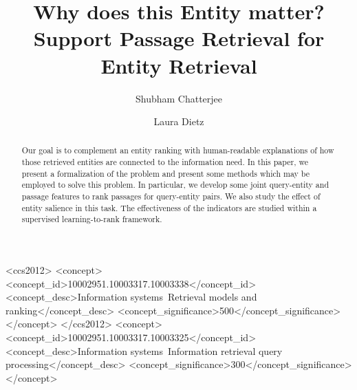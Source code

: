 \documentclass[sigconf]{acmart}
\begin{document}
\fancyhead{}


\title[Support Passage Retrieval]{Why does this Entity matter? Support Passage Retrieval for Entity Retrieval}


\author{Shubham Chatterjee}
\author{Laura Dietz}

%
\renewcommand{\shortauthors}{Chatterjee and Dietz}

%
\begin{abstract}
Our goal is to complement an entity ranking with human-readable explanations of how those retrieved entities are connected to the information need. In this paper, we present a formalization of the problem and present some methods which may be employed to solve this problem. In particular, we develop some joint query-entity and passage features to rank passages for query-entity pairs. We also study the effect of entity salience in this task. The effectiveness of the indicators are studied within a supervised learning-to-rank framework. 
\end{abstract}

%
%
\begin{CCSXML}
<ccs2012>
 <concept>
<concept_id>10002951.10003317.10003338</concept_id>
<concept_desc>Information systems~Retrieval models and ranking</concept_desc>
<concept_significance>500</concept_significance>
</concept>
</ccs2012>
<concept>
<concept_id>10002951.10003317.10003325</concept_id>
<concept_desc>Information systems~Information retrieval query processing</concept_desc>
<concept_significance>300</concept_significance>
</concept>
\end{CCSXML}
\end{document}

